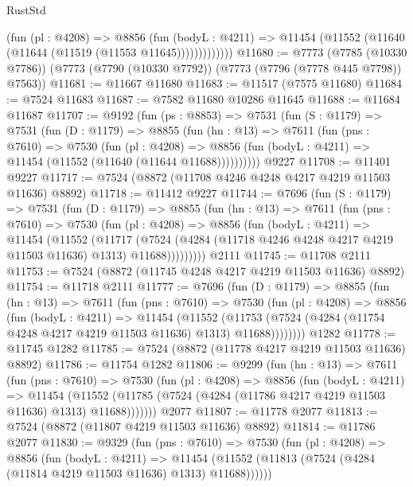\begin{lexlean}{RustStd}
\begin{coremodule}
                (fun (pl : @4208) =>
                @8856
                  (fun (bodyL : @4211) =>
                  @11454 (@11552 (@11640 (@11644 (@11519 (@11553 @11645)))))))))))))
@11680 := @7773
    (@7785 (@10330 @7786))
    (@7773 (@7790 (@10330 @7792)) (@7773 (@7796 (@7778 @445 @7798)) @7563))
@11681 := @11667 @11680
@11683 := @11517 (@7575 @11680)
@11684 := @7524 @11683
@11687 := @7582 @11680 @10286 @11645
@11688 := @11684 @11687
@11707 := @9192
    (fun (ps : @8853) =>
    @7531
      (fun (S : @1179) =>
      @7531
        (fun (D : @1179) =>
        @8855
          (fun (hn : @13) =>
          @7611
            (fun (pns : @7610) =>
            @7530
              (fun (pl : @4208) =>
              @8856 (fun (bodyL : @4211) => @11454 (@11552 (@11640 (@11644 @11688))))))))))
    @9227
@11708 := @11401 @9227
@11717 := @7524 (@8872 (@11708 @4246 @4248 @4217 @4219 @11503 @11636) @8892)
@11718 := @11412 @9227
@11744 := @7696
    (fun (S : @1179) =>
    @7531
      (fun (D : @1179) =>
      @8855
        (fun (hn : @13) =>
        @7611
          (fun (pns : @7610) =>
          @7530
            (fun (pl : @4208) =>
            @8856
              (fun (bodyL : @4211) =>
              @11454
                (@11552
                  (@11717
                    (@7524
                      (@4284 (@11718 @4246 @4248 @4217 @4219 @11503 @11636) @1313)
                      @11688)))))))))
    @2111
@11745 := @11708 @2111
@11753 := @7524 (@8872 (@11745 @4248 @4217 @4219 @11503 @11636) @8892)
@11754 := @11718 @2111
@11777 := @7696
    (fun (D : @1179) =>
    @8855
      (fun (hn : @13) =>
      @7611
        (fun (pns : @7610) =>
        @7530
          (fun (pl : @4208) =>
          @8856
            (fun (bodyL : @4211) =>
            @11454
              (@11552
                (@11753 (@7524 (@4284 (@11754 @4248 @4217 @4219 @11503 @11636) @1313) @11688))))))))
    @1282
@11778 := @11745 @1282
@11785 := @7524 (@8872 (@11778 @4217 @4219 @11503 @11636) @8892)
@11786 := @11754 @1282
@11806 := @9299
    (fun (hn : @13) =>
    @7611
      (fun (pns : @7610) =>
      @7530
        (fun (pl : @4208) =>
        @8856
          (fun (bodyL : @4211) =>
          @11454
            (@11552 (@11785 (@7524 (@4284 (@11786 @4217 @4219 @11503 @11636) @1313) @11688)))))))
    @2077
@11807 := @11778 @2077
@11813 := @7524 (@8872 (@11807 @4219 @11503 @11636) @8892)
@11814 := @11786 @2077
@11830 := @9329
    (fun (pns : @7610) =>
    @7530
      (fun (pl : @4208) =>
      @8856
        (fun (bodyL : @4211) =>
        @11454 (@11552 (@11813 (@7524 (@4284 (@11814 @4219 @11503 @11636) @1313) @11688))))))

\end{coremodule}
\end{lexlean}
